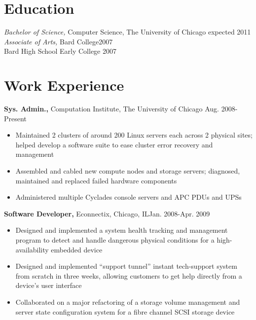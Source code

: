 \documentclass[line,overlapped]{res}
\begin{document}
 
 
 
\address{jalewis@uchicago.edu \hspace{1.6in} Current: 1151 E. 61th St. Apt. 1E, Chicago, IL 60637}
\address{(917) 974-7144 \hspace{2.18in} Permananent: 6 Warren Place, Brooklyn, NY 11201}

 
\newsectionwidth{.2in}
\begin{resume} 
 
\section{Education} 
{\sl Bachelor of Science,} Computer Science, The University of Chicago \hfill expected 2011\\
{\sl Associate of Arts,} Bard College\hfill 2007\\
Bard High School Early College \hfill 2007

\section{Work Experience}
{\bf Sys. Admin.,} Computation Institute, The University of Chicago \hfill Aug. 2008-Present
\begin{itemize} \itemsep -2pt %
    \item Maintained 2 clusters of around 200 Linux servers each across 2 physical sites; helped develop a software suite to ease cluster error recovery and management
    \item Assembled and cabled new compute nodes and storage servers; diagnosed, maintained and replaced failed hardware components
    \item Administered multiple Cyclades console servers and APC PDUs and UPSs
\end{itemize}

{\bf Software Developer,} Econnectix, Chicago, IL\hfill Jan. 2008-Apr. 2009
\begin{itemize} \itemsep -2pt %
    \item Designed and implemented a system health tracking and management program to detect and handle dangerous physical conditions for a high-availability embedded device
    \item Designed and implemented ``support tunnel'' instant tech-support system from scratch in three weeks, allowing customers to get help directly from a device's user interface
    \item Collaborated on a major refactoring of a storage volume management and server state configuration system for a fibre channel SCSI storage device
\end{itemize}


\end{resume}
\end{document}
